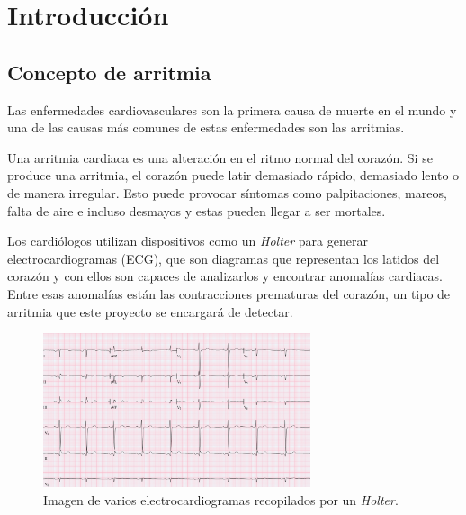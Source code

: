 \titlespacing*{\chapter}{0pt}{-1.25cm}{25pt}
\chapter{Introducción}
\section{Concepto de arritmia}
Las enfermedades cardiovasculares son la primera causa de muerte en el mundo y una de las causas más comunes
de estas enfermedades son las arritmias.

Una arritmia cardiaca es una alteración en el ritmo normal del corazón. Si se produce una arritmia, el corazón 
puede latir demasiado rápido, demasiado lento o de manera irregular. Esto puede provocar síntomas como palpitaciones,
mareos, falta de aire e incluso desmayos y estas pueden llegar a ser mortales.

Los cardiólogos utilizan dispositivos como un \textit{Holter} para generar electrocardiogramas (ECG), que son 
diagramas que representan los latidos del corazón y con ellos son capaces de analizarlos y encontrar anomalías cardiacas.
Entre esas anomalías están las contracciones prematuras del corazón, un tipo de arritmia que este proyecto se encargará de detectar. 

\begin{figure}[h!]
	\centering
	\includegraphics[width=0.7\textwidth]{./Images/img_introduccion/electrocardiograma.png}
	\caption{Imagen de varios electrocardiogramas recopilados por un \textit{Holter}.}
	\label{fig:electrocardiogramas}
\end{figure}


